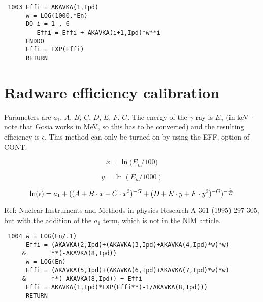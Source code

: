 \begin{verbatim}
 1003 Effi = AKAVKA(1,Ipd)
      w = LOG(1000.*En)
      DO i = 1 , 6
         Effi = Effi + AKAVKA(i+1,Ipd)*w**i
      ENDDO
      Effi = EXP(Effi)
      RETURN
\end{verbatim}

\section{Radware efficiency calibration}

Parameters are $a_1$, $A$, $B$, $C$, $D$, $E$, $F$, $G$. The
energy of the $\gamma$ ray is $E_n$ (in keV - note that Gosia works in MeV,
so this has to be converted) and the resulting efficiency is $\epsilon$.
This method can only be turned on by using the EFF, option of CONT.

\begin{equation}
x = \ln\big({E_n/100}\big)
\end{equation}

\begin{equation}
y = \ln(E_n/1000)
\end{equation}

\begin{equation}
\ln(\epsilon) = a_1 + ((A + B \cdot x + C \cdot x^2) ^{-G} +
(D + E \cdot y + F \cdot y^2)^{-G})^{-{1 \over G}}
\end{equation}

Ref: Nuclear Instruments and Methods in physics Research A 361 (1995)
297-305, but with the addition of the $a_1$ term, which is not in the NIM
article.

\begin{verbatim}
 1004 w = LOG(En/.1)
      Effi = (AKAVKA(2,Ipd)+(AKAVKA(3,Ipd)+AKAVKA(4,Ipd)*w)*w)
     &       **(-AKAVKA(8,Ipd))
      w = LOG(En)
      Effi = (AKAVKA(5,Ipd)+(AKAVKA(6,Ipd)+AKAVKA(7,Ipd)*w)*w)
     &       **(-AKAVKA(8,Ipd)) + Effi
      Effi = AKAVKA(1,Ipd)*EXP(Effi**(-1/AKAVKA(8,Ipd)))
      RETURN
\end{verbatim}


